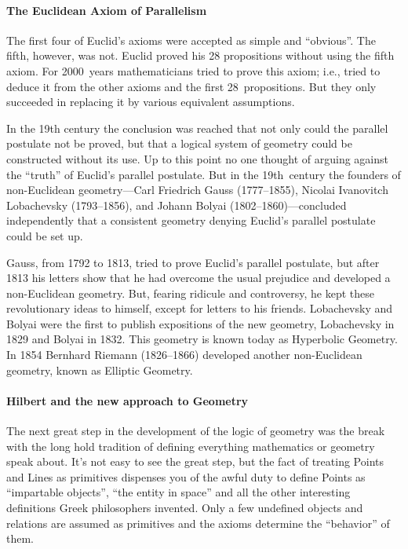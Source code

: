 %
\paragraph{The Euclidean Axiom of Parallelism}
The first four of Euclid's axioms were
accepted as simple and ``obvious''. The fifth, however, was
not. Euclid proved his 28 propositions without using the fifth
axiom. For 2000~years mathematicians tried to prove this axiom; i.e.,
tried to deduce it from the other axioms and the first
28~propositions. But they only succeeded in replacing it by various
equivalent assumptions.

In the 19th century the conclusion was reached that not only could the
parallel postulate not be proved, but that a logical system of
geometry could be constructed without its use. Up to this point no one
thought of arguing against the ``truth'' of Euclid's  parallel
postulate. But in the 19th~century the founders of non-Euclidean
geometry---Carl Friedrich Gauss (1777--1855),
Nicolai Ivanovitch Lobachevsky (1793--1856),
and Johann Bolyai (1802--1860)---concluded
independently that a consistent geometry denying Euclid's parallel
postulate could be set up.

Gauss, from 1792 to 1813, tried to prove Euclid's parallel
postulate, but after 1813 his letters show that he had overcome the
usual prejudice and developed a non-Euclidean geometry. But, fearing
ridicule and controversy, he kept these revolutionary ideas to
himself, except for letters to his friends. Lobachevsky and Bolyai
were the first to publish expositions of the new geometry, Lobachevsky
in 1829 and Bolyai in 1832. This geometry is known today as
Hyperbolic Geometry. In 1854 Bernhard Riemann
(1826--1866) developed another non-Euclidean
geometry, known as Elliptic Geometry.

%
\paragraph{Hilbert and the new approach to Geometry}
The next great step in the development of the logic of geometry was
the break with the long hold tradition of defining everything
mathematics or geometry speak about.
It's not easy to see the great step, but the fact of treating
Points and Lines as primitives dispenses you of the
awful duty to define Points as ``impartable objects'', ``the entity
in space'' and all the other interesting definitions Greek
philosophers invented. 
Only a few undefined objects and relations are assumed as primitives
and the axioms determine the ``behavior'' of them.

